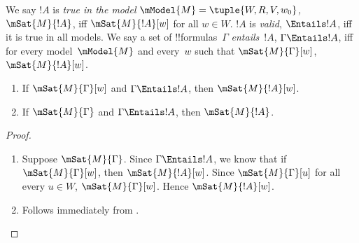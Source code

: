 \documentclass[../../../include/open-logic-section]{subfiles}
\begin{document}


\begin{defn}
  We say $!A$ is \emph{true in the model $\mModel{M} = \tuple{W,R,V,
      w_0}$,} $\mSat{M}{!A}$, iff $\mSat{M}{!A}[w]$ for all $w \in W$.
  $!A$ is \emph{valid}, $\Entails !A$, iff it is true in all models.
  We say a set of !!{formula}s~$\Gamma$ \emph{entails}~$!A$, $\Gamma
  \Entails !A$, iff for every model~$\mModel{M}$ and every~$w$ such
  that $\mSat{M}{\Gamma}[w]$, $\mSat{M}{!A}[w]$.
\end{defn}

\begin{prop}
  \begin{enumerate}
  \item{} If $\mSat{M}{\Gamma}[w]$ and
    $\Gamma \Entails !A$, then $\mSat{M}{!A}[w]$.
  \item{} If $\mSat{M}{\Gamma}$ and $\Gamma
    \Entails !A$, then $\mSat{M}{!A}$.
  \end{enumerate}
\end{prop}

\begin{proof}
  \begin{enumerate}
  \item Suppose $\mSat{M}{\Gamma}$. Since $\Gamma \Entails !A$, we
    know that if $\mSat{M}{\Gamma}[w]$, then $\mSat{M}{!A}[w]$. Since
    $\mSat{M}{\Gamma}[u]$ for all every $u \in W$,
    $\mSat{M}{\Gamma}[w]$. Hence $\mSat{M}{!A}[w]$.
  \item Follows immediately from .
  \end{enumerate}
\end{proof}
\end{document}
